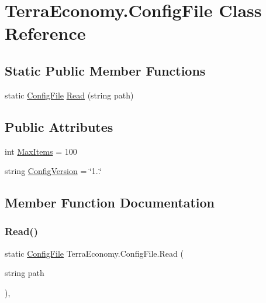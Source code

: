 \hypertarget{class_terra_economy_1_1_config_file}{}\section{Terra\+Economy.\+Config\+File Class Reference}
\label{class_terra_economy_1_1_config_file}
\subsection*{Static Public Member Functions}
\begin{DoxyCompactItemize}
\item 
static \hyperlink{class_terra_economy_1_1_config_file}{Config\+File} \hyperlink{class_terra_economy_1_1_config_file_a4dc9c79197d8f7243b162879f60856d0}{Read} (string path)
\end{DoxyCompactItemize}
\subsection*{Public Attributes}
\begin{DoxyCompactItemize}
\item 
int \hyperlink{class_terra_economy_1_1_config_file_a86eff860551f33113f028ab0061e004f}{Max\+Items} = 100
\item 
string \hyperlink{class_terra_economy_1_1_config_file_a4207abf524f54145483758285d66cbfb}{Config\+Version} = \char`\"{}1..\char`\"{}
\end{DoxyCompactItemize}


\subsection{Member Function Documentation}
\mbox{\label{class_terra_economy_1_1_config_file_a4dc9c79197d8f7243b162879f60856d0}} 
\subsubsection{\texorpdfstring{Read()}{Read()}}
{\footnotesize\ttfamily static \hyperlink{class_terra_economy_1_1_config_file}{Config\+File} Terra\+Economy.\+Config\+File.\+Read (\begin{DoxyParamCaption}\item[{string}]{path }\end{DoxyParamCaption})\hspace{0.3cm}{\ttfamily [inline]}, {\ttfamily [static]}}



